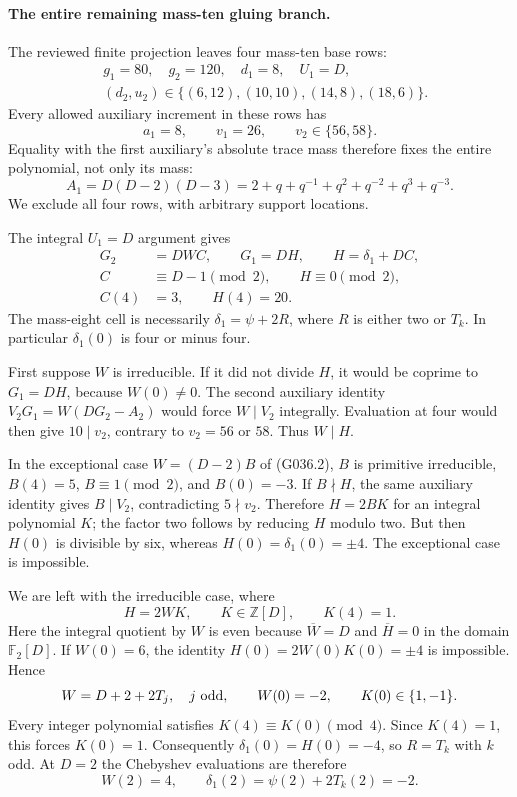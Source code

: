 \paragraph{The entire remaining mass-ten gluing branch.}
The reviewed finite projection leaves four mass-ten base rows:
\[
 \begin{aligned}
 &g_1=80,\quad g_2=120,\quad d_1=8,\quad U_1=D,\\
 &(d_2,u_2)\in\{(6,12),(10,10),(14,8),(18,6)\}.
 \end{aligned}
\]
Every allowed auxiliary increment in these rows has
\[
 a_1=8,\qquad v_1=26,\qquad v_2\in\{56,58\}.
\]
Equality with the first auxiliary's absolute trace mass
therefore fixes the entire polynomial, not only its mass:
\[
 A_1=D(D-2)(D-3)
   =2+q+q^{-1}+q^2+q^{-2}+q^3+q^{-3}.                 \tag{G036.T1}
\]
We exclude all four rows, with arbitrary support locations.

The integral $U_1=D$ argument gives
\[
 \begin{aligned}
 G_2&=DWC,\qquad G_1=DH,\qquad H=\delta_1+DC,\\
 C&\equiv D-1\pmod2,\qquad H\equiv0\pmod2,\\
 C(4)&=3,\qquad H(4)=20.
 \end{aligned}                                                   \tag{G036.T2}
\]
The mass-eight cell is necessarily
$\delta_1=\psi+2R$, where $R$ is either two or $T_k$.
In particular $\delta_1(0)$ is four or minus four.

First suppose $W$ is irreducible. If it did not divide
$H$, it would be coprime to $G_1=DH$, because $W(0)\ne0$.
The second auxiliary identity
$V_2G_1=W(DG_2-A_2)$ would force $W\mid V_2$ integrally.
Evaluation at four would then give $10\mid v_2$, contrary
to $v_2=56$ or $58$. Thus $W\mid H$.

In the exceptional case $W=(D-2)B$ of (G036.2),
$B$ is primitive irreducible, $B(4)=5$,
$B\equiv1\pmod2$, and $B(0)=-3$.
If $B\nmid H$, the same auxiliary identity gives
$B\mid V_2$, contradicting $5\nmid v_2$.
Therefore $H=2BK$ for an integral polynomial $K$;
the factor two follows by reducing $H$ modulo two.
But then $H(0)$ is divisible by six, whereas
$H(0)=\delta_1(0)=\pm4$. The exceptional case is impossible.

We are left with the irreducible case, where
\[
 H=2WK,\qquad K\in\mathbb Z[D],\qquad K(4)=1.
\]
Here the integral quotient by $W$ is even because
$\overline W=D$ and $\overline H=0$ in the domain
$\mathbb F_2[D]$. If $W(0)=6$, the identity
$H(0)=2W(0)K(0)=\pm4$ is impossible. Hence
\[
 W=D+2+2T_j,\quad j\ {\rm odd},\qquad W(0)=-2,
 \qquad K(0)\in\{1,-1\}.
\]
Every integer polynomial satisfies $K(4)\equiv K(0)\pmod4$.
Since $K(4)=1$, this forces $K(0)=1$.
Consequently $\delta_1(0)=H(0)=-4$, so
$R=T_k$ with $k$ odd. At $D=2$ the Chebyshev
evaluations are therefore
\[
 W(2)=4,\qquad \delta_1(2)=\psi(2)+2T_k(2)=-2.
                                                                  \tag{G036.T3}
\]

